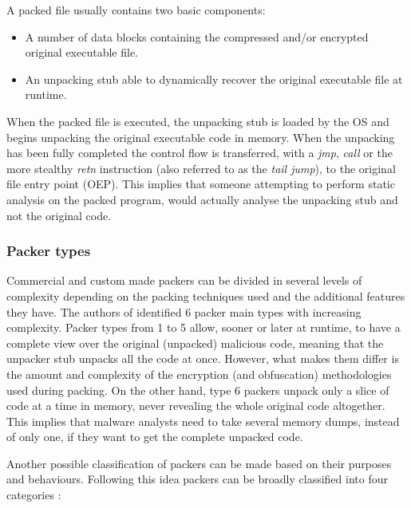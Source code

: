 \documentclass[pdfa%
,cucitura%
]{toptesi}
\begin{document}
A packed file usually contains two basic components:
\begin{itemize}
	\item A number of data blocks containing the compressed and/or encrypted original executable file.
	
	\item An unpacking stub able to dynamically recover the original executable file at runtime.
\end{itemize}

When the packed file is executed, the unpacking stub is loaded by the OS and begins unpacking the original executable code in memory. When the unpacking has been fully completed the control flow is transferred, with a \textit{jmp}, \textit{call} or the more stealthy \textit{retn} instruction (also referred to as the \textit{tail jump}), to the original file entry point (OEP). This implies that someone attempting to perform static analysis on the packed program, would actually analyse the unpacking stub and not the original code.

\subsubsection{Packer types}
Commercial and custom made packers can be divided in several levels of complexity depending on the packing techniques used and the additional features they have.
The authors of \cite{PedreroDPI} identified 6 packer main types with increasing complexity.
Packer types from 1 to 5 allow, sooner or later at runtime, to have a complete view over the original (unpacked) malicious code, meaning that the unpacker stub unpacks all the code at once. However, what makes them differ is the amount and complexity of the encryption (and obfuscation) methodologies used during packing. On the other hand, type 6 packers unpack only a slice of code at a time in memory, never revealing the whole original code altogether. This implies that malware analysts need to take several memory dumps, instead of only one, if they want to get the complete unpacked code.

Another possible classification of packers can be made based on their purposes and behaviours. Following this idea packers can be broadly classified into four categories \cite{WeiRPM}:
\end{document}
